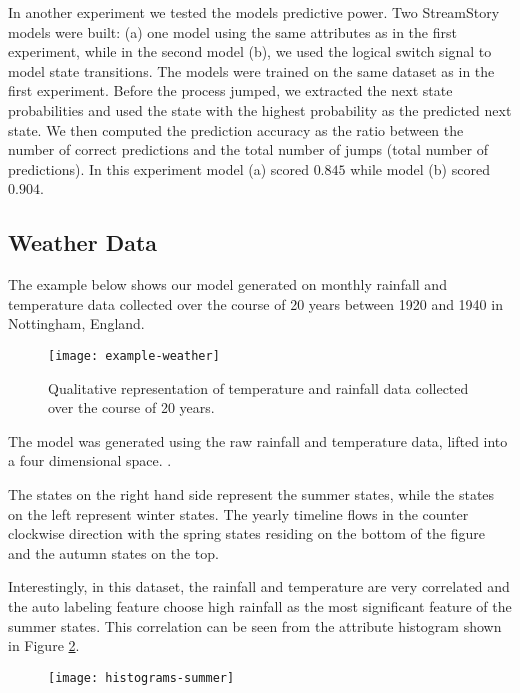 In another experiment we tested the models predictive power. Two StreamStory models were built: (a) one 
model using the same attributes as in the first experiment, while in the second model (b), we used
the logical switch signal to model state transitions. The models were trained on the same dataset
as in the first experiment. Before the process jumped, we extracted the next state probabilities
and used the state with the highest probability as the predicted next state. We then computed
the prediction accuracy as the ratio between the number of correct predictions and the total number
of jumps (total number of predictions). In this experiment model (a) scored $0.845$ while model
(b) scored $0.904$.


\subsection{Weather Data }
\label{sec:experiments-weather}

The example below shows our model generated on monthly rainfall and temperature data
collected over the course of 20 years between 1920 and 1940 in Nottingham, England.

\begin{figure}[h!]
	\centering
	\texttt{[image: example-weather]}
	\caption{Qualitative representation of temperature and rainfall data collected over the course of 20 years.}
	\label{fig:example-weather}
\end{figure}

The model was generated using the raw rainfall and temperature data, lifted into a four dimensional space.
.

The states on the right hand side represent the 
summer states, while the states on the left represent winter states. The yearly timeline flows in the
counter clockwise direction with the spring states residing on the bottom of the figure and the autumn
states on the top.

Interestingly, in this dataset, the rainfall and temperature are very correlated and the auto labeling feature
choose high rainfall as the most significant feature of the summer states. This correlation can be seen
from the attribute histogram shown in Figure \ref{fig:histograms-summer}.

\begin{figure}[h!]
	\centering
	\texttt{[image: histograms-summer]}
	\caption{}
	\label{fig:histograms-summer}
\end{figure}

